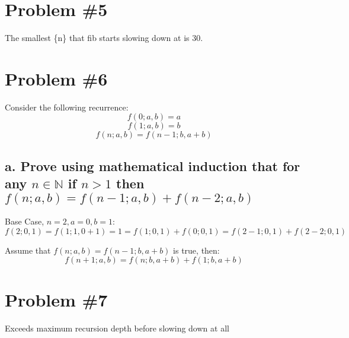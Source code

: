 \documentclass{article}
\newcommand {\N}{\mathbb{N}}
\begin{document}
\section*{Problem \#5}
The smallest \{n\} that fib starts slowing down at is 30.

\section*{Problem \#6}
Consider the following recurrence:
\[f(0; a, b) = a\]
\[f(1; a, b) = b\]
\[f(n; a, b) = f(n - 1; b, a + b)\]
\subsection*{a. Prove using mathematical induction that for any \(n \in \N\) if \(n > 1\) then \(f(n; a, b) = f(n - 1; a, b) + f(n - 2; a, b)\)}
Base Case, \(n = 2, a = 0, b = 1\):
\[f(2; 0, 1) = f(1; 1, 0 + 1) = 1 = f(1; 0, 1) + f(0; 0, 1) = f(2 - 1; 0, 1) + f(2 - 2; 0, 1)\]



Assume that \(f(n; a, b) = f(n - 1; b, a + b)\) is true, then:
\[f(n + 1; a, b) = f(n; b, a + b) + f(1; b, a + b)\]

\section*{Problem \#7}
Exceeds maximum recursion depth before slowing down at all
\end{document}
